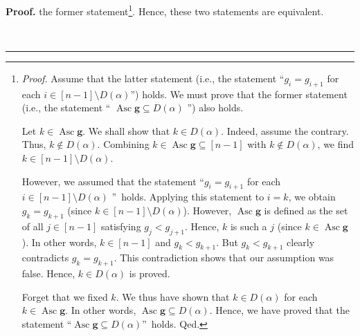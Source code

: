 \documentclass[numbers=enddot,12pt,final,onecolumn,notitlepage]{scrartcl}%
\theoremstyle{definition}
\newenvironment{proof}[1][Proof]{\noindent\textbf{#1.} }{\ \rule{0.5em}{0.5em}}
\newenvironment{verlong}{}{}
\begin{document}
\begin{verlong}
\begin{proof}
the former statement\footnote{\textit{Proof.} Assume that the latter statement
(i.e., the statement \textquotedblleft$g_{i}=g_{i+1}$ for each $i\in\left[
n-1\right]  \setminus D\left(  \alpha\right)  $\textquotedblright) holds. We
must prove that the former statement (i.e., the statement \textquotedblleft%
$\operatorname*{Asc}\mathbf{g}\subseteq D\left(  \alpha\right)  $%
\textquotedblright) also holds.
\par
Let $k\in\operatorname*{Asc}\mathbf{g}$. We shall show that $k\in D\left(
\alpha\right)  $. Indeed, assume the contrary. Thus, $k\notin D\left(
\alpha\right)  $. Combining $k\in\operatorname*{Asc}\mathbf{g}\subseteq\left[
n-1\right]  $ with $k\notin D\left(  \alpha\right)  $, we find $k\in\left[
n-1\right]  \setminus D\left(  \alpha\right)  $.
\par
However, we assumed that the statement \textquotedblleft$g_{i}=g_{i+1}$ for
each $i\in\left[  n-1\right]  \setminus D\left(  \alpha\right)  $%
\textquotedblright\ holds. Applying this statement to $i=k$, we obtain
$g_{k}=g_{k+1}$ (since $k\in\left[  n-1\right]  \setminus D\left(
\alpha\right)  $). However, $\operatorname*{Asc}\mathbf{g}$ is defined as the
set of all $j\in\left[  n-1\right]  $ satisfying $g_{j}<g_{j+1}$. Hence, $k$
is such a $j$ (since $k\in\operatorname*{Asc}\mathbf{g}$). In other words,
$k\in\left[  n-1\right]  $ and $g_{k}<g_{k+1}$. But $g_{k}<g_{k+1}$ clearly
contradicts $g_{k}=g_{k+1}$. This contradiction shows that our assumption was
false. Hence, $k\in D\left(  \alpha\right)  $ is proved.
\par
Forget that we fixed $k$. We thus have shown that $k\in D\left(
\alpha\right)  $ for each $k\in\operatorname*{Asc}\mathbf{g}$. In other words,
$\operatorname*{Asc}\mathbf{g}\subseteq D\left(  \alpha\right)  $. Hence, we
have proved that the statement \textquotedblleft$\operatorname*{Asc}%
\mathbf{g}\subseteq D\left(  \alpha\right)  $\textquotedblright\ holds. Qed.}.
Hence, these two statements are equivalent.


\end{proof}
\end{verlong}
\end{document}
